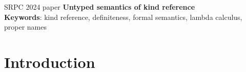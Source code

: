 \documentclass[a4paper, 12pt]{article}
\begin{document}

\thispagestyle{empty}
\begin{center}
    SRPC 2024 paper
    \vfill
    \textbf{Untyped semantics of kind reference}\\
    \vfill
    \textbf{Keywords}: kind reference, definiteness, formal semantics, lambda calculus, proper names





                       

\end{center}
\pagebreak

\tableofcontents
\pagebreak

\section{Introduction}
\end{document}
